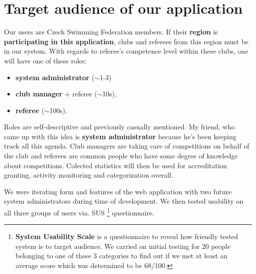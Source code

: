 \section{Target audience of our application}
Our users are Czech Swimming Federation members. If their \textbf{region} is \textbf{participating in this application}, clubs and referees from this region must be in our system. With regards to referee's competence level within these clubs, one will have one of these roles: 
\begin{itemize}
  \item \textbf{system administrator} ($\sim$1-3)
  \item \textbf{club manager} + referee ($\sim$10s),
  \item \textbf{referee} ($\sim$100s).
\end{itemize} 
Roles are self-descriptive and previously casually mentioned. My friend, who came up with this idea is \textbf{system administrator} because he's been keeping track all this agenda. Club managers are taking care of competitions on behalf of the club and referees are common people who have some degree of knowledge about competitions. Colected statistics will then be used for accreditation granting, activity monitoring and categorization overall.
\par
We were iterating form and features of the web application with two future system administrators during time of development. We then tested usability on all three groups of users via. SUS \footnote{\textbf{System Usability Scale} is a questionnaire to reveal how friendly tested system is to target audience. We carried on initial testing for 20 people belonging to one of these 3 categories to find out if we met at least an average score which was determined to be 68/100.} questionnaire.
